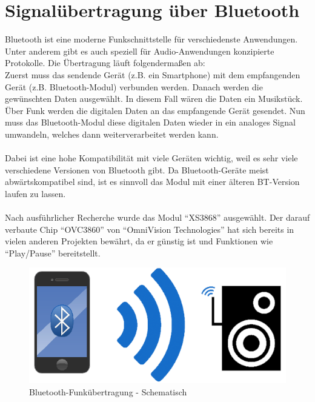 \section{Signalübertragung über Bluetooth}\label{sec:3.3}
Bluetooth ist eine moderne Funkschnittstelle für verschiedenste Anwendungen.
Unter anderem gibt es auch speziell für Audio-Anwendungen konzipierte Protokolle.
Die Übertragung läuft folgendermaßen ab:
\\
Zuerst muss das sendende Gerät (z.B. ein Smartphone) mit dem empfangenden Gerät (z.B. Bluetooth-Modul) verbunden werden.
Danach werden die gewünschten Daten ausgewählt.
In diesem Fall wären die Daten ein Musikstück.
Über Funk werden die digitalen Daten an das empfangende Gerät gesendet.
Nun muss das Bluetooth-Modul diese digitalen Daten wieder in ein analoges Signal umwandeln, welches dann weiterverarbeitet werden kann.
\\ \\
Dabei ist eine hohe Kompatibilität mit viele Geräten wichtig, weil es sehr viele verschiedene Versionen von Bluetooth gibt.
Da Bluetooth-Geräte meist abwärtskompatibel sind, ist es sinnvoll das Modul mit einer älteren BT-Version laufen zu lassen.
\\ \\
Nach ausführlicher Recherche wurde das Modul \enquote{XS3868} ausgewählt.
Der darauf verbaute Chip \enquote{OVC3860} von \enquote{OmniVision Technologies} hat sich bereits in vielen anderen Projekten bewährt, da er günstig ist und Funktionen wie \enquote{Play/Pause} bereitstellt.

\begin{figure} [H]
	\centering
	\includegraphics[width=1\textwidth]{img/Grundlagen/Bluetooth/BT-uebertragung-cut.jpg}
	\caption{Bluetooth-Funkübertragung - Schematisch}
	\label{fig:3.3.1}
\end{figure}



